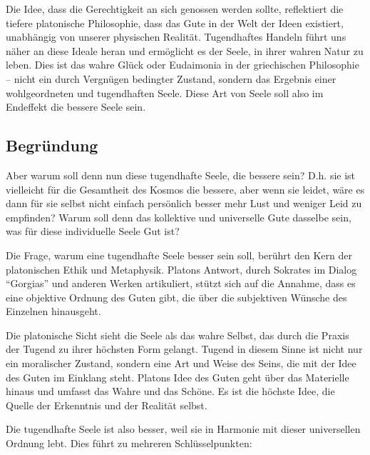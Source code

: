 \documentclass[12pt,a4paper]{article}
\begin{document}
Die Idee, dass die Gerechtigkeit an sich genossen werden sollte, reflektiert die tiefere platonische Philosophie, dass das Gute in der Welt der Ideen existiert, unabhängig von unserer physischen Realität. Tugendhaftes Handeln führt uns näher an diese Ideale heran und ermöglicht es der Seele, in ihrer wahren Natur zu leben. Dies ist das wahre Glück oder Eudaimonia in der griechischen Philosophie – nicht ein durch Vergnügen bedingter Zustand, sondern das Ergebnis einer wohlgeordneten und tugendhaften Seele. Diese Art von Seele soll also im Endeffekt die bessere Seele sein.

\subsection[short]{Begründung}
Aber warum soll denn nun diese tugendhafte Seele, die bessere sein? D.h. sie ist vielleicht für die Gesamtheit des Kosmos die bessere, aber wenn sie leidet, wäre es dann für sie selbst nicht einfach persönlich besser mehr Lust und weniger Leid zu empfinden? Warum soll denn das kollektive und universelle Gute dasselbe sein, was für diese individuelle Seele Gut ist?

Die Frage, warum eine tugendhafte Seele besser sein soll, berührt den Kern der platonischen Ethik und Metaphysik. Platons Antwort, durch Sokrates im Dialog \enquote{Gorgias} und anderen Werken artikuliert, stützt sich auf die Annahme, dass es eine objektive Ordnung des Guten gibt, die über die subjektiven Wünsche des Einzelnen hinausgeht.

Die platonische Sicht sieht die Seele als das wahre Selbst, das durch die Praxis der Tugend zu ihrer höchsten Form gelangt. Tugend in diesem Sinne ist nicht nur ein moralischer Zustand, sondern eine Art und Weise des Seins, die mit der Idee des Guten im Einklang steht. Platons Idee des Guten geht über das Materielle hinaus und umfasst das Wahre und das Schöne. Es ist die höchste Idee, die Quelle der Erkenntnis und der Realität selbst.

Die tugendhafte Seele ist also besser, weil sie in Harmonie mit dieser universellen Ordnung lebt. Dies führt zu mehreren Schlüsselpunkten:
\end{document}
